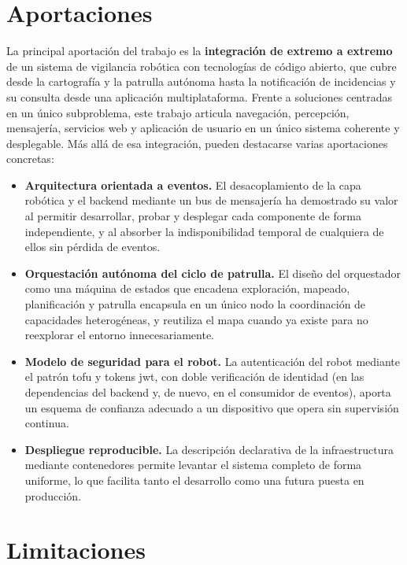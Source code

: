\section{Aportaciones}
\label{sec:aportaciones}

La principal aportación del trabajo es la \textbf{integración de extremo a extremo} de un
sistema de vigilancia robótica con tecnologías de código abierto, que cubre desde la
cartografía y la patrulla autónoma hasta la notificación de incidencias y su consulta desde
una aplicación multiplataforma. Frente a soluciones centradas en un único subproblema, este
trabajo articula navegación, percepción, mensajería, servicios web y aplicación de usuario
en un único sistema coherente y desplegable. Más allá de esa integración, pueden destacarse
varias aportaciones concretas:

\begin{itemize}
  \item \textbf{Arquitectura orientada a eventos.} El desacoplamiento de la capa robótica y
    el backend mediante un bus de mensajería ha demostrado su valor al permitir desarrollar,
    probar y desplegar cada componente de forma independiente, y al absorber la
    indisponibilidad temporal de cualquiera de ellos sin pérdida de eventos.
  \item \textbf{Orquestación autónoma del ciclo de patrulla.} El diseño del orquestador como
    una máquina de estados que encadena exploración, mapeado, planificación y patrulla
    encapsula en un único nodo la coordinación de capacidades heterogéneas, y reutiliza el
    mapa cuando ya existe para no reexplorar el entorno innecesariamente.
  \item \textbf{Modelo de seguridad para el robot.} La autenticación del robot mediante el
    patrón \gls{tofu} y tokens \gls{jwt}, con doble verificación de identidad (en las
    dependencias del backend y, de nuevo, en el consumidor de eventos), aporta un esquema de
    confianza adecuado a un dispositivo que opera sin supervisión continua.
  \item \textbf{Despliegue reproducible.} La descripción declarativa de la infraestructura
    mediante contenedores permite levantar el sistema completo de forma uniforme, lo que
    facilita tanto el desarrollo como una futura puesta en producción.
\end{itemize}

\section{Limitaciones}
\label{sec:limitaciones}

